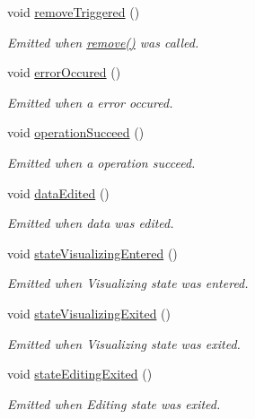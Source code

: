 \begin{DoxyCompactItemize}
void \hyperlink{classmdt_abstract_sql_widget_aea7a2ee49ce26a4069cbd8f7e0e65654}{remove\-Triggered} ()
\begin{DoxyCompactList}\small\item\em Emitted when \hyperlink{classmdt_abstract_sql_widget_a748f85ff383d3f11fda4db7f931edb1c}{remove()} was called. \end{DoxyCompactList}\item 
void \hyperlink{classmdt_abstract_sql_widget_a27d3a1a75cddf6653f919e5ff3f2e8b4}{error\-Occured} ()
\begin{DoxyCompactList}\small\item\em Emitted when a error occured. \end{DoxyCompactList}\item 
void \hyperlink{classmdt_abstract_sql_widget_aa514b36fecc323dfdf8eedeec7838dd1}{operation\-Succeed} ()
\begin{DoxyCompactList}\small\item\em Emitted when a operation succeed. \end{DoxyCompactList}\item 
void \hyperlink{classmdt_abstract_sql_widget_a8ae6e67e3efb5051dc7a8b74571d4aa1}{data\-Edited} ()
\begin{DoxyCompactList}\small\item\em Emitted when data was edited. \end{DoxyCompactList}\item 
void \hyperlink{classmdt_abstract_sql_widget_a4acc0adbe6e002cd559642d3ea8e2d3a}{state\-Visualizing\-Entered} ()
\begin{DoxyCompactList}\small\item\em Emitted when Visualizing state was entered. \end{DoxyCompactList}\item 
void \hyperlink{classmdt_abstract_sql_widget_a8f2eda6e219e49c972834a1e5c39e8ff}{state\-Visualizing\-Exited} ()
\begin{DoxyCompactList}\small\item\em Emitted when Visualizing state was exited. \end{DoxyCompactList}\item 
void \hyperlink{classmdt_abstract_sql_widget_a925485d7acc131d438f6ea251c9b1fb9}{state\-Editing\-Exited} ()
\begin{DoxyCompactList}\small\item\em Emitted when Editing state was exited. \end{DoxyCompactList}\item 

\end{DoxyCompactItemize}
